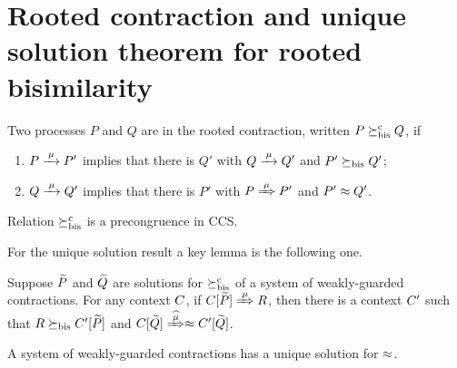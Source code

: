 
\section{Rooted contraction and unique solution theorem for rooted bisimilarity}
\label{ss:new}

\begin{definition}
\label{d:rcontra}
Two processes $P$ and $Q$ are in the rooted contraction, written 
 $P\mathrel{\succeq^{\rm{c}}_{\rm{bis}}} Q$, if
\begin{enumerate}
\item $P \arr\mu P'$ implies that there is $Q'$ with $Q \arr \mu Q'$
 and $P'\mathrel{\succeq_{\rm{bis}}} Q'$;
\item $Q \arr\mu Q'$   implies that there is $P'$ with $P \Arr \mu
 P'$ and $P' \approx Q'$.
\end{enumerate}
\end{definition}

\begin{theorem}
\label{t:rcontrPrecongruence}
Relation $\mathrel{\succeq^{\rm{c}}_{\rm{bis}}}$ is a precongruence in CCS. 
\end{theorem}  


For the unique solution result a key lemma is the following one. 

\begin{lemma}
\label{l:uptocon}
Suppose $\widetilde P$ and $\widetilde Q$ are solutions  for $\mathrel{\succeq^{\rm{c}}_{\rm{bis}}}$ 
 of a system of weakly-guarded
contractions.
For any context $C$, 
if  $\ct{\til P}\Arr{\mu}  R$,
 then 
there is a  context $C'$
such that $R \mathrel{\succeq_{\rm{bis}}} C' [\widetilde P]$ and  $\ct{\til Q} \Arcap{\mu}
 \wb \ctp{\til Q}$.
\end{lemma}

\begin{theorem}
\label{t:contraBisimulationU}
A system of weakly-guarded contractions
    has 
a unique solution 
 for $\approx$.
\end{theorem} 


